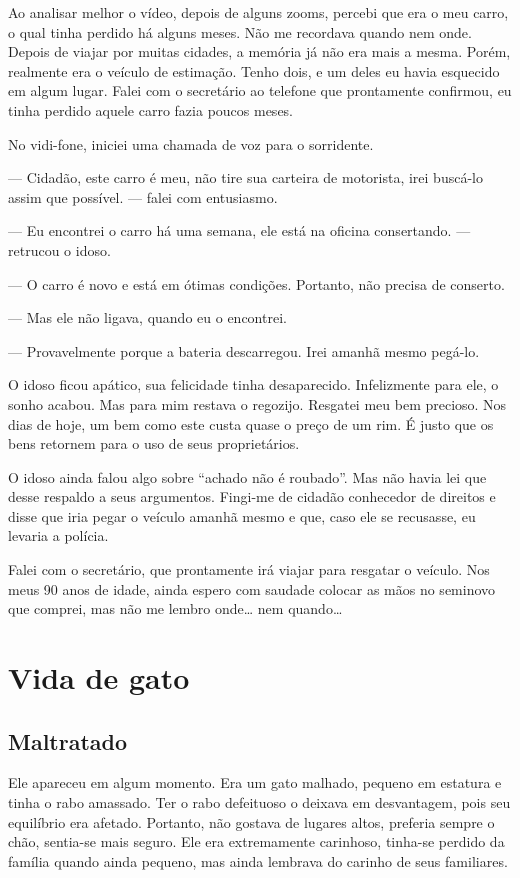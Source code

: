 \documentclass[a4paper,14pt]{book}
\begin{document}
Ao analisar melhor o vídeo, depois de alguns zooms, percebi que era o meu carro, o qual tinha perdido há alguns meses. Não me recordava quando nem onde. Depois de viajar por muitas cidades, a memória já não era mais a mesma. Porém, realmente era o veículo de estimação. Tenho dois, e um deles eu havia esquecido em algum lugar. Falei com o secretário ao telefone que prontamente confirmou, eu tinha perdido aquele carro fazia poucos meses.

No vidi-fone, iniciei uma chamada de voz para o sorridente.

— Cidadão, este carro é meu, não tire sua carteira de motorista, irei buscá-lo assim que possível. — falei com entusiasmo.

— Eu encontrei o carro há uma semana, ele está na oficina consertando. — retrucou o idoso.

— O carro é novo e está em ótimas condições. Portanto, não precisa de conserto.

— Mas ele não ligava, quando eu o encontrei.

— Provavelmente porque a bateria descarregou. Irei amanhã mesmo pegá-lo.

O idoso ficou apático, sua felicidade tinha desaparecido. Infelizmente para ele, o sonho acabou. Mas para mim restava o regozijo. Resgatei meu bem precioso. Nos dias de hoje, um bem como este custa quase o preço de um rim. É justo que os bens retornem para o uso de seus proprietários.

O idoso ainda falou algo sobre “achado não é roubado”. Mas não havia lei que desse respaldo a seus argumentos. Fingi-me de cidadão conhecedor de direitos e disse que iria pegar o veículo amanhã mesmo e que, caso ele se recusasse, eu levaria a polícia.

Falei com o secretário, que prontamente irá viajar para resgatar o veículo. Nos meus 90 anos de idade, ainda espero com saudade colocar as mãos no seminovo que comprei, mas não me lembro onde… nem quando…


\chapter{Vida de gato}

\section*{Maltratado}

Ele apareceu em algum momento. Era um gato malhado, pequeno em estatura e tinha o rabo amassado. Ter o rabo defeituoso o deixava em desvantagem, pois seu equilíbrio era afetado. Portanto, não gostava de lugares altos, preferia sempre o chão, sentia-se mais seguro. Ele era extremamente carinhoso, tinha-se perdido da família quando ainda pequeno, mas ainda lembrava do carinho de seus familiares.
\end{document}
